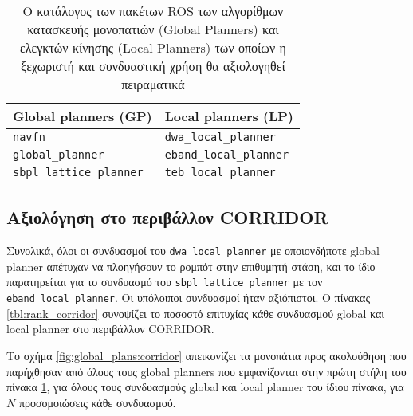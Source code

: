 \begin{table}[h]\centering
\begin{tabular}{l|l}
  Global planners (GP) & Local planners (LP) \\ \toprule
  \texttt{navfn} & \texttt{dwa\_local\_planner} \\
  \texttt{global\_planner} & \texttt{eband\_local\_planner} \\
  \texttt{sbpl\_lattice\_planner} & \texttt{teb\_local\_planner} \\ \bottomrule
\end{tabular}
  \caption{\small Ο κατάλογος των πακέτων ROS των αλγορίθμων κατασκευής
           μονοπατιών (Global Planners) και ελεγκτών κίνησης (Local Planners)
           των οποίων η ξεχωριστή και συνδυαστική χρήση θα αξιολογηθεί
           πειραματικά}
\label{tbl:planners_sifted_list}
\end{table}


\subsection{Αξιολόγηση στο περιβάλλον CORRIDOR}
\label{subsection:02_01_04:02}

Συνολικά, όλοι οι συνδυασμοί του \texttt{dwa\_local\_planner} με οποιονδήποτε
global planner απέτυχαν να πλοηγήσουν το ρομπότ στην επιθυμητή στάση, και το
ίδιο παρατηρείται για το συνδυασμό του \texttt{sbpl\_lattice\_planner} με τον
\texttt{eband\_local\_planner}. Οι υπόλοιποι συνδυασμοί ήταν αξιόπιστοι. Ο
πίνακας \ref{tbl:rank_corridor} συνοψίζει το ποσοστό επιτυχίας
κάθε συνδυασμού global και local planner στο περιβάλλον CORRIDOR.

Το σχήμα \ref{fig:global_plans:corridor} απεικονίζει τα μονοπάτια προς ακολούθηση
που παρήχθησαν από όλους τους global planners που εμφανίζονται στην πρώτη στήλη του πίνακα
\ref{tbl:planners_sifted_list}, για όλους τους συνδυασμούς global και local
planner του ίδιου πίνακα, για $N$ προσομοιώσεις κάθε συνδυασμού.

